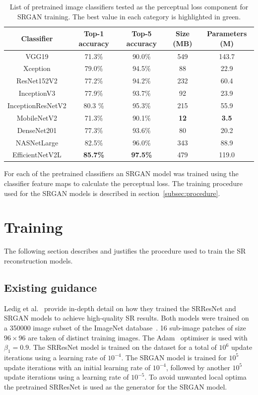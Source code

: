 \begin{table}
    \centering
    \begin{tabular}{ccccc}
        \toprule
        \textbf{Classifier} & \textbf{Top-1 accuracy} & \textbf{Top-5 accuracy} & \textbf{Size (MB)} & \textbf{Parameters (M)} \\
        \midrule
        VGG19 & 71.3\% & 90.0\% & 549 & 143.7 \\
        Xception & 79.0\% & 94.5\% & 88 & 22.9 \\
        ResNet152V2 & 77.2\% & 94.2\% & 232 & 60.4 \\
        InceptionV3 & 77.9\% & 93.7\% & 92 & 23.9 \\
        InceptionResNetV2 & 80.3 \% & 95.3\% & 215 & 55.9 \\
        MobileNetV2 & 71.3\% & 90.1\% & \textbf{12} & \textbf{3.5} \\
        DenseNet201 & 77.3\% & 93.6\% & 80 & 20.2 \\
        NASNetLarge & 82.5\% & 96.0\% & 343 & 88.9 \\
    EfficientNetV2L & \textbf{85.7\%} & \textbf{97.5\%} & 479 & 119.0 \\
        \bottomrule
    \end{tabular}
    \caption{List of pretrained image classifiers tested as the perceptual loss component for SRGAN training. The best value in each category is highlighted in green.}
    \label{table:pretrained_classifiers}
\end{table}

For each of the pretrained classifiers an SRGAN model was trained using the classifier feature maps to calculate the perceptual loss. The training procedure used for the SRGAN models is described in section~\ref{subsec:procedure}.

\section{Training}
The following section describes and justifies the procedure used to train the SR reconstruction models.

\subsection{Existing guidance}
Ledig et al.~\cite{srgan} provide in-depth detail on how they trained the SRResNet and SRGAN models to achieve high-quality SR results. Both models were trained on a 350000 image subset of the ImageNet database~\cite{imageNet}. 16 sub-image patches of size $96 \times 96$ are taken of distinct training images. The Adam~\cite{adamOptimiser} optimiser is used with $\beta_1 = 0.9$. The SRResNet model is trained on the dataset for a total of $10^6$ update iterations using a learning rate of $10^{-4}$. The SRGAN model is trained for $10^5$ update iterations with an initial learning rate of $10^{-4}$, followed by another $10^5$ update iterations using a learning rate of $10^{-5}$. To avoid unwanted local optima the pretrained SRResNet is used as the generator for the SRGAN model.


